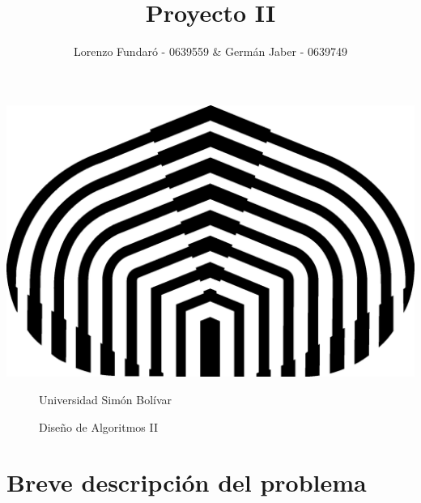 \documentclass[a4paper,10pt]{article}
\title{Proyecto II}
\author{Lorenzo Fundar\'o - 0639559 \& Germán Jaber - 0639749}
\begin{document}
\begin{center}
\includegraphics[scale = 0.75]{usb.png}
\end{center}
\begin{figure}[t]
\begin{center}
\large Universidad Simón Bolívar
\end{center}
\begin{center}
 \large Diseño de Algoritmos II
\end{center}


\end{figure}


\maketitle

\thispagestyle{empty}
\newpage

\tableofcontents{}
\newpage

\section{Breve descripción del problema}
\end{document}
